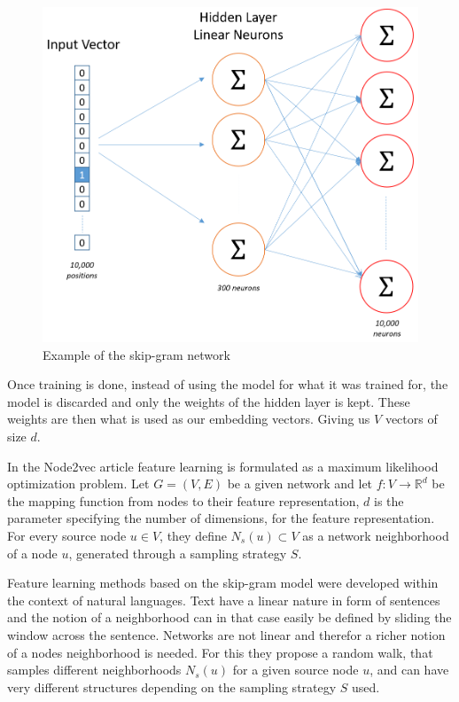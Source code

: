 \begin{figure}[H]
\centering
  \includegraphics[width=\linewidth]{Article/figures/skip_gram_net_arch.png}
  \caption{Example of the skip-gram network \cite{Word2vec}}
  \label{fig:skip-gram_example}
\end{figure}

Once training is done, instead of using the model for what it was trained for, the model is discarded and only the weights of the hidden layer is kept. These weights are then what is used as our embedding vectors. Giving us $V$ vectors of size $d$.


In the Node2vec article \cite{Node2vec} feature learning is formulated as a maximum likelihood optimization problem. Let $G = (V,E)$ be a given network and let $f : V \to \mathbb{R}^d$ be the mapping function from nodes to their feature representation, $d$ is the parameter specifying the number of dimensions, for the feature representation. For every source node $u \in V$, they define $N_s (u) \subset V$ as a network neighborhood of a node $u$, generated through a sampling strategy $S$.

Feature learning methods based on the skip-gram model were developed within the context of natural languages. Text have a linear nature in form of sentences and the notion of a neighborhood can in that case easily be defined by sliding the window across the sentence. Networks are not linear and therefor a richer notion of a nodes neighborhood is needed. For this they propose a random walk, that samples different neighborhoods $N_s (u)$ for a given source node $u$, and can have very different structures depending on the sampling strategy $S$ used.

